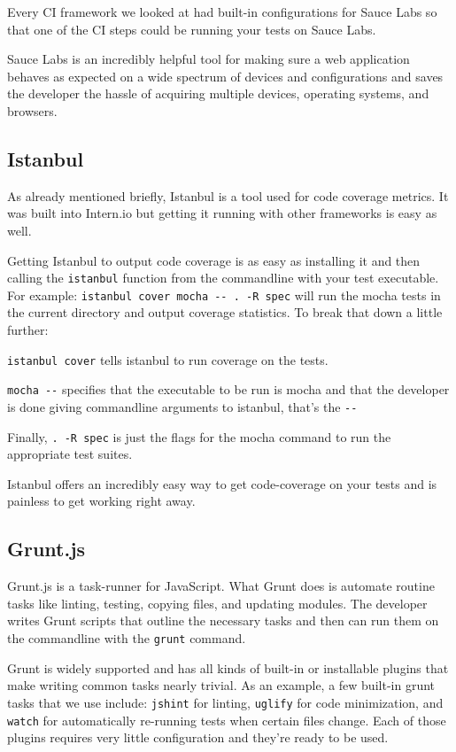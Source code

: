 \documentclass[12pt]{ucthesis}
\begin{document}
Every CI framework we looked at had built-in configurations for Sauce Labs so that one of the CI steps could be running your tests on Sauce Labs.

Sauce Labs is an incredibly helpful tool for making sure a web application behaves as expected on a wide spectrum of devices and configurations and saves the developer the hassle of acquiring multiple devices, operating systems, and browsers.

\subsection{Istanbul}
As already mentioned briefly, Istanbul\cite{Istanbul} is a tool used for code coverage metrics. It was built into Intern.io but getting it running with other frameworks is easy as well.

Getting Istanbul to output code coverage is as easy as installing it and then calling the \lstinline{istanbul} function from the commandline with your test executable.
For example: \lstinline{istanbul cover mocha -- . -R spec} will run the mocha tests in the current directory and output coverage statistics. To break that down a little further:

\lstinline{istanbul cover} tells istanbul to run coverage on the tests.

\lstinline{mocha --} specifies that the executable to be run is mocha and that the developer is done giving commandline arguments to istanbul, that's the \lstinline{--}

Finally, \lstinline{. -R spec} is just the flags for the mocha command to run the appropriate test suites.

Istanbul offers an incredibly easy way to get code-coverage on your tests and is painless to get working right away.

\subsection{Grunt.js}
Grunt.js\cite{GruntJS} is a task-runner for JavaScript. What Grunt does is automate routine tasks like linting, testing, copying files, and updating modules. The developer writes Grunt scripts that outline the necessary tasks and then can run them on the commandline with the \lstinline{grunt} command.

Grunt is widely supported and has all kinds of built-in or installable plugins that make writing common tasks nearly trivial. As an example, a few built-in grunt tasks that we use include: \lstinline{jshint} for linting, \lstinline{uglify} for code minimization, and \lstinline{watch} for automatically re-running tests when certain files change. Each of those plugins requires very little configuration and they're ready to be used.
\end{document}

